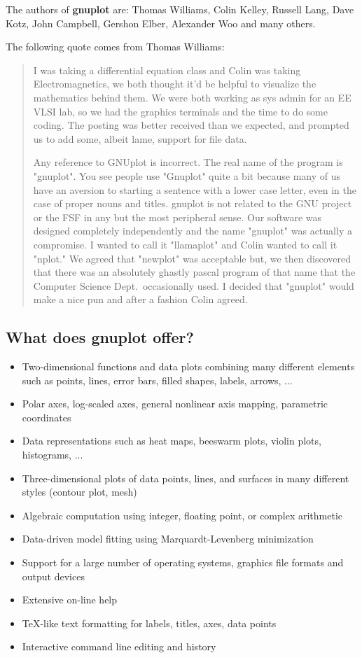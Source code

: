 \documentclass[a4paper,11pt]{article}
\newcommand{\gnuplot}{\textbf{gnuplot }}
\begin{document}
The authors of \gnuplot are:
Thomas Williams, Colin Kelley, Russell Lang, Dave Kotz, John
Campbell, Gershon Elber, Alexander Woo and many others.

The following quote comes from Thomas Williams:
\begin{quote}
     I was taking a differential equation class and Colin was taking
     Electromagnetics, we both thought it'd be helpful to visualize the
     mathematics behind them. We were both working as sys admin for an
     EE VLSI lab, so we had the graphics terminals and the time to do
     some coding. The posting was better received than we expected, and
     prompted us to add some, albeit lame, support for file data.

     Any reference to GNUplot is incorrect. The real name of the program
     is "gnuplot". You see people use "Gnuplot" quite a bit because many
     of us have an aversion to starting a sentence with a lower case
     letter, even in the case of proper nouns and titles. gnuplot is not
     related to the GNU project or the FSF in any but the most
     peripheral sense. Our software was designed completely
     independently and the name "gnuplot" was actually a compromise. I
     wanted to call it "llamaplot" and Colin wanted to call it "nplot."
     We agreed that "newplot" was acceptable but, we then discovered
     that there was an absolutely ghastly pascal program of that name
     that the Computer Science Dept.\ occasionally used. I decided that
     "gnuplot" would make a nice pun and after a fashion Colin agreed.
\end{quote}


\subsection{What does \gnuplot offer?}

\begin{itemize}
\item Two-dimensional functions and data plots combining many different
elements such as points, lines, error bars, filled shapes, labels, arrows, ...
\item Polar axes, log-scaled axes, general nonlinear axis mapping, parametric coordinates
\item Data representations such as heat maps, beeswarm plots, violin plots, histograms, ...
\item Three-dimensional plots of data points, lines, and surfaces in
many different styles (contour plot, mesh)
\item Algebraic computation using integer, floating point, or complex arithmetic
\item Data-driven model fitting using Marquardt-Levenberg minimization
\item Support for a large number of operating systems, graphics
file formats and output devices
\item Extensive on-line help
\item \TeX{}-like text formatting for labels, titles, axes, data points
\item Interactive command line editing and history
\end{itemize}
\end{document}
